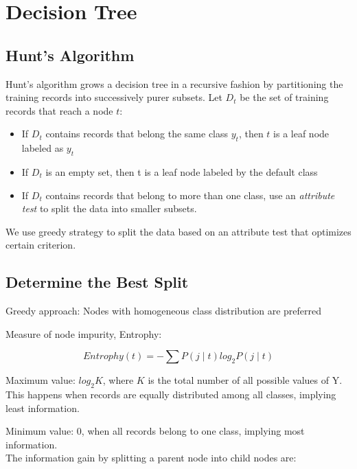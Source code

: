 \chapter{Decision Tree}

\begin{multicols}{2}
\section{Hunt's Algorithm}

\noindent Hunt's algorithm grows a decision tree in a recursive fashion by partitioning the training records into successively purer subsets. Let $D_t$ be the set of training records that reach a node $t$:

\begin{itemize}
    \item If $D_t$ contains records that belong the same class $y_t$, then $t$ is a leaf node labeled as $y_t$
    \item If $D_t$ is an empty set, then t is a leaf node labeled by the default class
    \item If $D_t$ contains records that belong to more than one class, use an \textit{attribute test} to split the data into smaller subsets.
\end{itemize}

\noindent We use greedy strategy to split the data based on an attribute test that optimizes certain criterion. 

\section{Determine the Best Split}

\noindent Greedy approach: Nodes with homogeneous class distribution are preferred

\noindent Measure of node impurity, Entrophy:

$$Entrophy(t)=-\sum P(j \mid t) log_2 P(j \mid t)$$ 

\noindent Maximum value: $log_{2} K$, where $K$ is the total number of all possible values of Y. This happens when records are equally distributed among all classes, implying least information. 

\noindent Minimum value: 0, when all records belong to one class, implying most information. \\

\noindent The information gain by splitting a parent node into child nodes are:


\end{multicols}
